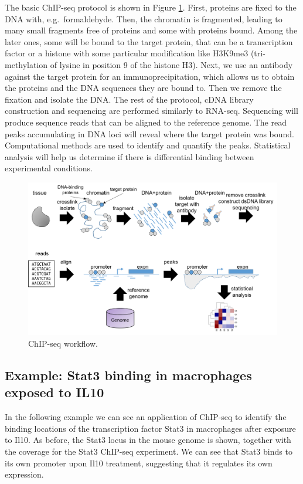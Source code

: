 \documentclass[]{book}
\theoremstyle{definition}
\theoremstyle{definition}
\theoremstyle{definition}
\theoremstyle{remark}
\begin{document}
The basic ChIP-seq protocol is shown in Figure \ref{fig:ngs-chipseq}.
First, proteins are fixed to the DNA with, e.g.~formaldehyde. Then, the
chromatin is fragmented, leading to many small fragments free of
proteins and some with proteins bound. Among the later ones, some will
be bound to the target protein, that can be a transcription factor or a
histone with some particular modification like H3K9me3 (tri-methylation
of lysine in position 9 of the histone H3). Next, we use an antibody
against the target protein for an immunoprecipitation, which allows us
to obtain the proteins and the DNA sequences they are bound to. Then we
remove the fixation and isolate the DNA. The rest of the protocol, cDNA
library construction and sequencing are performed similarly to RNA-seq.
Sequencing will produce sequence reads that can be aligned to the
reference genome. The read peaks accumulating in DNA loci will reveal
where the target protein was bound. Computational methods are used to
identify and quantify the peaks. Statistical analysis will help us
determine if there is differential binding between experimental
conditions.

\begin{figure}
\includegraphics[width=19.07in]{pic/ngs_chipseq} \caption{ChIP-seq workflow.}\label{fig:ngs-chipseq}
\end{figure}

\subsection{Example: Stat3 binding in macrophages exposed to
IL10}\label{example-stat3-binding-in-macrophages-exposed-to-il10}

In the following example we can see an application of ChIP-seq to
identify the binding locations of the transcription factor Stat3 in
macrophages after exposure to Il10. As before, the Stat3 locus in the
mouse genome is shown, together with the coverage for the Stat3 ChIP-seq
experiment. We can see that Stat3 binds to its own promoter upon Il10
treatment, suggesting that it regulates its own expression.
\end{document}
